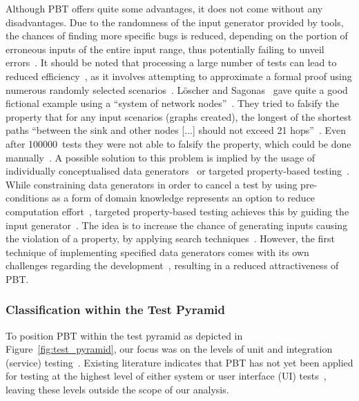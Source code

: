 \documentclass[runningheads]{llncs}
\begin{document}
Although PBT offers quite some advantages, it does not come without any disadvantages. Due to the randomness of the input generator provided by tools, the chances of finding more specific bugs is reduced, depending on the portion of erroneous inputs of the entire input range, thus potentially failing to unveil errors~\cite{Loescher2017,Padhye2019,ElazarMittelman2023,Shi2023}. It should be noted that processing a large number of tests can lead to reduced efficiency~\cite{ElazarMittelman2023,Shi2023}, as it involves attempting to approximate a formal proof using numerous randomly selected scenarios~\cite{Fink1997,ElazarMittelman2023,Paraskevopoulou2015}. Löscher and Sagonas~\cite{Loescher2017} gave quite a good fictional example using a ``system of network nodes''~\cite{Loescher2017}. They tried to falsify the property that for any input scenarios (graphs created), the longest of the shortest paths ``between the sink and other nodes [...] should not exceed 21 hops''~\cite{Loescher2017}. Even after 100000~tests they were not able to falsify the property, which could be done manually~\cite{Loescher2017}. A possible solution to this problem is implied by the usage of individually conceptualised data generators~\cite{Loescher2017,ElazarMittelman2023,Shi2023,Paraskevopoulou2015,Claessen2000} or targeted property-based testing~\cite{Loescher2017}. While constraining data generators in order to cancel a test by using pre-conditions as a form of domain knowledge represents an option to reduce computation effort~\cite{Loescher2017,ElazarMittelman2023,Shi2023}, targeted property-based testing achieves this by guiding the input generator~\cite{Loescher2017}. The idea is to increase the chance of generating inputs causing the violation of a property, by applying search techniques~\cite{Loescher2017}. However, the first technique of implementing specified data generators comes with its own challenges regarding the development~\cite{Loescher2017,ElazarMittelman2023,Shi2023}, resulting in a reduced attractiveness of PBT.

\subsubsection{Classification within the Test Pyramid}
To position PBT within the test pyramid as depicted in Figure~\ref{fig:test_pyramid}, our focus was on the levels of unit and integration (service) testing~\cite{Aniche2022,Radziwill2020}. Existing literature indicates that PBT has not yet been applied for testing at the highest level of either system or user interface (UI) tests~\cite{Radziwill2020,Aniche2022}, leaving these levels outside the scope of our analysis.
\end{document}
